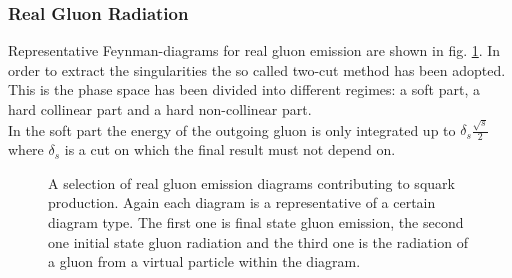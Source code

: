 \subsubsection{Real Gluon Radiation}
Representative Feynman-diagrams for real gluon emission are shown in fig. \ref{fig:RealGluon}. In order to extract the singularities the so called two-cut method has been adopted. This is the phase space has been divided into different regimes: a soft part, a hard collinear part and a hard non-collinear part.\\
In the soft part the energy of the outgoing gluon is only integrated up to  $\delta_s \frac{\sqrt{s}}{2}$ where $\delta_s$ is a cut on which the final result must not depend on.
\begin{figure}[!htbp]
\begin{center}
\caption{A selection of real gluon emission diagrams contributing to squark production. Again each diagram is a representative of a certain diagram type. The first one is final state gluon emission, the second one initial state gluon radiation and the third one is the radiation of a gluon from a virtual particle within the diagram.}\label{fig:RealGluon}
\end{center}
\end{figure}



